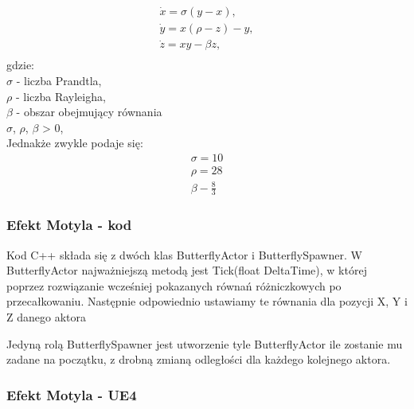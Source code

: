 \documentclass[a4paper,12pt,reqno]{article}
\begin{document}
\begin{equation}
\begin{split}
\dot{x}=\sigma(y-x),\\
\dot{y}=x(\rho-z)-y,\\
\dot{z}=xy-\beta z,\\
\end{split}
\end{equation}
gdzie:\\
$\sigma$ - liczba Prandtla,\\
$\rho$ - liczba Rayleigha,\\
$\beta$ - obszar obejmujący równania\\
$\sigma$, $\rho$, $\beta$ > 0,\\
Jednakże zwykle podaje się\cite{lorenz_dziwne_atraktory}:\\
\begin{equation}
\begin{split}
\sigma = 10\\
\rho = 28\\
\beta - \frac{8}{3}
\end{split}
\label{ButterflyVariables}
\end{equation}

\subsubsection{Efekt Motyla - kod}

Kod C++ składa się z dwóch klas ButterflyActor i ButterflySpawner.
W ButterflyActor najważniejszą metodą jest Tick(float DeltaTime), w której poprzez rozwiązanie wcześniej pokazanych równań różniczkowych po przecałkowaniu. Następnie odpowiednio ustawiamy te równania dla pozycji X, Y i Z danego aktora \cite{motyle_cpp}



Jedyną rolą ButterflySpawner jest utworzenie tyle ButterflyActor ile zostanie mu zadane na początku, z drobną zmianą odległości dla każdego kolejnego aktora.




\subsubsection{Efekt Motyla - UE4}
\end{document}
